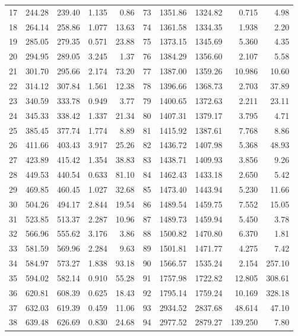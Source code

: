 \documentclass[11pt,a4paper]{article}
\begin{document}
\begin{longtable}{rrrrr@{\hskip 1.6em}rrrrr}
17 & 244.28 & 239.40 & 1.135 & 0.86 & 73 & 1351.86 & 1324.82 & 0.715 & 4.98 \\
18 & 264.14 & 258.86 & 1.077 & 13.63 & 74 & 1361.58 & 1334.35 & 1.938 & 2.20 \\
19 & 285.05 & 279.35 & 0.571 & 23.88 & 75 & 1373.15 & 1345.69 & 5.360 & 4.35 \\
20 & 294.95 & 289.05 & 3.245 & 1.37 & 76 & 1384.29 & 1356.60 & 2.107 & 5.58 \\
21 & 301.70 & 295.66 & 2.174 & 73.20 & 77 & 1387.00 & 1359.26 & 10.986 & 10.60 \\
22 & 314.12 & 307.84 & 1.561 & 12.38 & 78 & 1396.66 & 1368.73 & 2.703 & 37.89 \\
23 & 340.59 & 333.78 & 0.949 & 3.77 & 79 & 1400.65 & 1372.63 & 2.211 & 23.11 \\
24 & 345.33 & 338.42 & 1.337 & 21.34 & 80 & 1407.31 & 1379.17 & 3.795 & 4.71 \\
25 & 385.45 & 377.74 & 1.774 & 8.89 & 81 & 1415.92 & 1387.61 & 7.768 & 8.86 \\
26 & 411.66 & 403.43 & 3.917 & 25.26 & 82 & 1436.72 & 1407.98 & 5.368 & 48.93 \\
27 & 423.89 & 415.42 & 1.354 & 38.83 & 83 & 1438.71 & 1409.93 & 3.856 & 9.26 \\
28 & 449.53 & 440.54 & 0.633 & 81.10 & 84 & 1462.43 & 1433.18 & 2.650 & 5.42 \\
29 & 469.85 & 460.45 & 1.027 & 32.68 & 85 & 1473.40 & 1443.94 & 5.230 & 11.66 \\
30 & 504.26 & 494.17 & 2.844 & 19.54 & 86 & 1489.54 & 1459.75 & 7.552 & 15.05 \\
31 & 523.85 & 513.37 & 2.287 & 10.96 & 87 & 1489.73 & 1459.94 & 5.450 & 3.78 \\
32 & 566.96 & 555.62 & 3.176 & 3.86 & 88 & 1500.82 & 1470.80 & 6.370 & 1.81 \\
33 & 581.59 & 569.96 & 2.284 & 9.63 & 89 & 1501.81 & 1471.77 & 4.275 & 7.42 \\
34 & 584.97 & 573.27 & 1.838 & 93.18 & 90 & 1566.57 & 1535.24 & 2.154 & 257.10 \\
35 & 594.02 & 582.14 & 0.910 & 55.28 & 91 & 1757.98 & 1722.82 & 12.805 & 308.61 \\
36 & 620.81 & 608.39 & 0.625 & 18.43 & 92 & 1795.14 & 1759.24 & 10.169 & 328.18 \\
37 & 632.03 & 619.39 & 0.459 & 11.06 & 93 & 2934.52 & 2837.68 & 48.614 & 47.10 \\
38 & 639.48 & 626.69 & 0.830 & 24.68 & 94 & 2977.52 & 2879.27 & 139.250 & 7.80 \\

\end{longtable}
\end{document}

